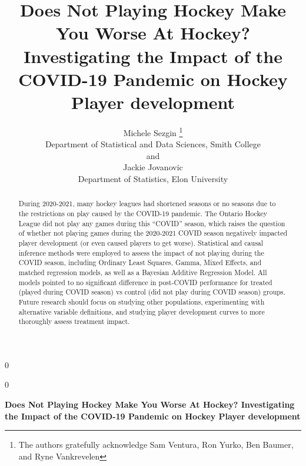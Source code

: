 \documentclass[12pt]{article}
\newcommand{\blind}{0}
\begin{document}
\def\spacingset#1{\renewcommand{\baselinestretch}%
{#1}\small\normalsize} \spacingset{1}



\blind
{
  \title{\bf Does Not Playing Hockey Make You Worse At Hockey?
Investigating the Impact of the COVID-19 Pandemic on Hockey Player
development}

  \author{
        Michele Sezgin \thanks{The authors gratefully acknowledge Sam
Ventura, Ron Yurko, Ben Baumer, and Ryne Vankrevelen} \\
    Department of Statistical and Data Sciences, Smith College\\
     and \\     Jackie Jovanovic \\
    Department of Statistics, Elon University\\
      }
  \maketitle
} \fi

\blind
{
  \bigskip
  \bigskip
  \bigskip
  \begin{center}
    {\LARGE\bf Does Not Playing Hockey Make You Worse At Hockey?
Investigating the Impact of the COVID-19 Pandemic on Hockey Player
development}
  \end{center}
  \medskip
} \fi

\bigskip
\begin{abstract}
During 2020-2021, many hockey leagues had shortened seasons or no
seasons due to the restrictions on play caused by the COVID-19 pandemic.
The Ontario Hockey League did not play any games during this ``COVID''
season, which raises the question of whether not playing games during
the 2020-2021 COVID season negatively impacted player development (or
even caused players to get worse). Statistical and causal inference
methods were employed to assess the impact of not playing during the
COVID season, including Ordinary Least Squares, Gamma, Mixed Effects,
and matched regression models, as well as a Bayesian Additive Regression
Model. All models pointed to no significant difference in post-COVID
performance for treated (played during COVID season) vs control (did not
play during COVID season) groups. Future research should focus on
studying other populations, experimenting with alternative variable
definitions, and studying player development curves to more thoroughly
assess treatment impact.
\end{abstract}
\end{document}
